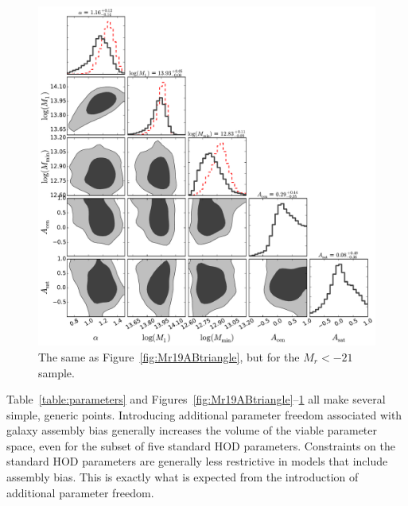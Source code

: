 \documentclass[usenatbib,usegraphicx,letterpaper]{mn2e}
\begin{document}
\begin{figure}
\begin{center}
\includegraphics[width=15.0cm]{Mr21ABTri.pdf}
\caption{
The same as Figure~\ref{fig:Mr19ABtriangle}, but for the $M_r<-21$ sample.
}
\label{fig:Mr21ABtriangle}
\end{center}
\end{figure}


Table~\ref{table:parameters} and Figures~\ref{fig:Mr19ABtriangle}--\ref{fig:Mr21ABtriangle}
all make several simple, generic points. Introducing additional parameter
freedom associated with galaxy assembly bias generally increases the volume of the 
viable parameter space, even for the subset of five standard HOD parameters. 
Constraints on the standard HOD parameters are generally less restrictive in models that 
include assembly bias. This is exactly what is expected from the introduction of additional 
parameter freedom.
\end{document}
